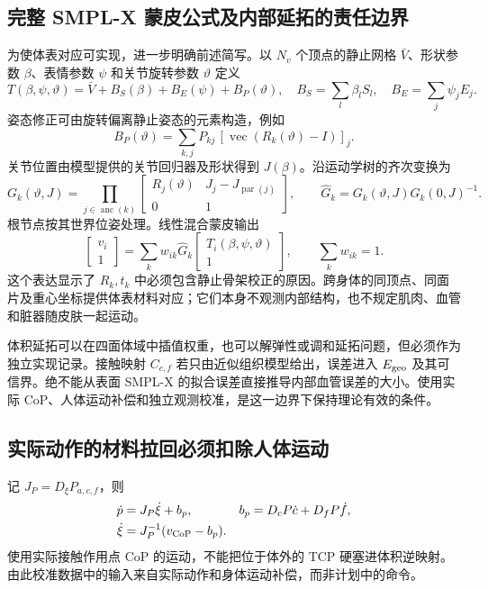 \documentclass[11pt,a4paper]{article}
\numberwithin{equation}{section}
\theoremstyle{definition}
\begin{document}
\subsection{完整 SMPL-X 蒙皮公式及内部延拓的责任边界}
\label{sec:v43:smpl-detail}
为使体表对应可实现，进一步明确前述简写。以 $N_v$ 个顶点的静止网格 $\bar V$、形状参数 $\beta$、表情参数 $\psi$ 和关节旋转参数 $\vartheta$ 定义
\begin{equation}
 T(\beta,\psi,\vartheta)=\bar V+B_S(\beta)+B_E(\psi)+B_P(\vartheta),
 \quad B_S=\sum_l\beta_l S_l,\quad B_E=\sum_j\psi_j E_j.
\end{equation}
姿态修正可由旋转偏离静止姿态的元素构造，例如
\begin{equation}
 B_P(\vartheta)=\sum_{k,j}P_{kj}\,[\operatorname{vec}(R_k(\vartheta)-I)]_j.
\end{equation}
关节位置由模型提供的关节回归器及形状得到 $J(\beta)$。沿运动学树的齐次变换为
\begin{equation}
 G_k(\vartheta,J)=\prod_{j\in\operatorname{anc}(k)}
 \begin{bmatrix}R_j(\vartheta)&J_j-J_{\operatorname{par}(j)}\\0&1\end{bmatrix},
 \qquad \widehat G_k=G_k(\vartheta,J)G_k(0,J)^{-1}.
\end{equation}
根节点按其世界位姿处理。线性混合蒙皮输出
\begin{equation}
 \begin{bmatrix}v_i\\1\end{bmatrix}
 =\sum_k w_{ik}\widehat G_k
 \begin{bmatrix}T_i(\beta,\psi,\vartheta)\\1\end{bmatrix},
 \qquad \sum_k w_{ik}=1.
\end{equation}
这个表达显示了 $R_k,t_k$ 中必须包含静止骨架校正的原因。跨身体的同顶点、同面片及重心坐标提供体表材料对应；它们本身不观测内部结构，也不规定肌肉、血管和脏器随皮肤一起运动。

体积延拓可以在四面体域中插值权重，也可以解弹性或调和延拓问题，但必须作为独立实现记录。接触映射 $C_{c,f}$ 若只由近似组织模型给出，误差进入 $E_{\rm geo}$ 及其可信界。绝不能从表面 SMPL-X 的拟合误差直接推导内部血管误差的大小。使用实际 CoP、人体运动补偿和独立观测校准，是这一边界下保持理论有效的条件。

\subsection{实际动作的材料拉回必须扣除人体运动}
记 $J_P=D_\xi P_{a,c,f}$，则
\begin{align}
 \dot p&=J_P\dot\xi+b_p,
 &b_p&=D_cP\dot c+D_fP\dot f,\\
 \dot\xi&=J_P^{-1}(v_{\rm CoP}-b_p).
\end{align}
使用实际接触作用点 CoP 的运动，不能把位于体外的 TCP 硬塞进体积逆映射。由此校准数据中的输入来自实际动作和身体运动补偿，而非计划中的命令。
\end{document}

